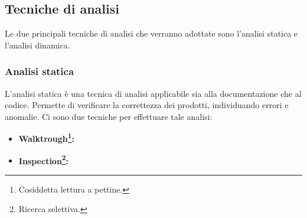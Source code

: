 \subsection{Tecniche di analisi}
Le due principali tecniche di analisi che verranno adottate sono l'analisi statica e l'analisi dinamica.
	\subsubsection{Analisi statica}
	L'analisi statica è una tecnica di analisi applicabile sia alla documentazione che al codice. Permette di verificare la correttezza dei prodotti, individuando errori e anomalie. Ci sono due tecniche per effettuare tale analisi:
	\begin{itemize}
		\item \textbf{Walktrough\footnote{Cosiddetta lettura a pettine.}:} 
		\item \textbf{Inspection\footnote{Ricerca selettiva.}:} 
	\end{itemize}
	

